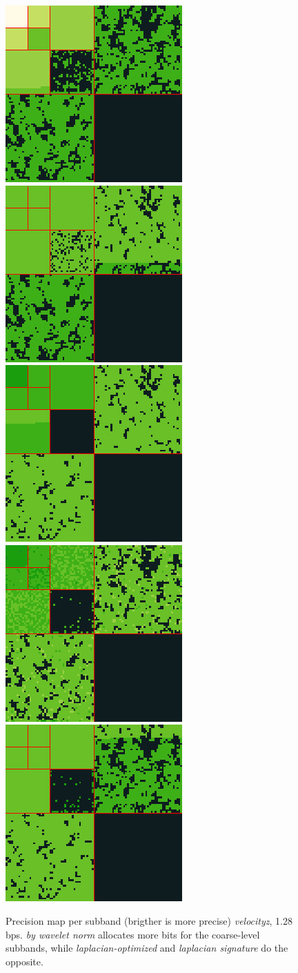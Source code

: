 \begin{figure}[h]
	{\includegraphics[width=0.32\linewidth]{img/laplacian/by-wavelet-norm.png}}
	{\includegraphics[width=0.32\linewidth]{img/laplacian/by-bit-plane.png}}
	{\includegraphics[width=0.32\linewidth]{img/laplacian/laplacian-signature.png}}
	{\includegraphics[width=0.32\linewidth]{img/laplacian/laplacian-optimized.png}}
	{\includegraphics[width=0.32\linewidth]{img/laplacian/gradient-signature.png}}
	\caption{Precision map per subband (brigther is more precise) \emph{velocityz}, 1.28 bps. \emph{by wavelet norm} allocates more bits for the coarse-level subbands, while \emph{laplacian-optimized} and \emph{laplacian signature} do the opposite.}
	\label{fig:laplacian-precision-comparison}
\end{figure}

